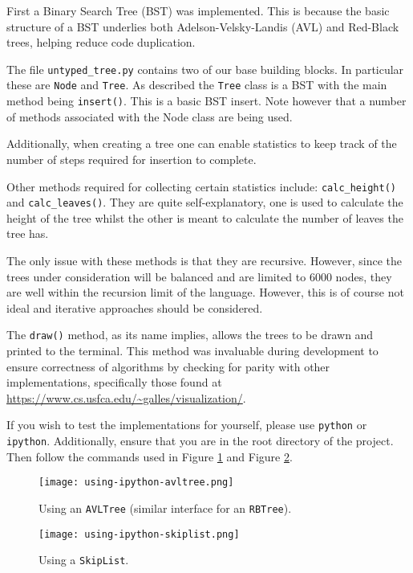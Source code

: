 \documentclass[article]{uom-coursework}
\begin{document}
First a Binary Search Tree (BST) was implemented. This is
because the basic structure of a BST underlies both
Adelson-Velsky-Landis (AVL) and Red-Black trees, helping reduce
code duplication.

The file \texttt{untyped\_tree.py} contains two of our base
building blocks. In particular these are \texttt{Node} and
\texttt{Tree}. As described the \texttt{Tree} class is a BST
with the main method being \texttt{insert()}. This is a basic
BST insert. Note however that a number of methods associated
with the Node class are being used.

Additionally, when creating a tree one can enable statistics to
keep track of the number of steps required for insertion to
complete.

Other methods required for collecting certain statistics
include: \texttt{calc\_height()} and \texttt{calc\_leaves()}.
They are quite self-explanatory, one is used to calculate the
height of the tree whilst the other is meant to calculate the
number of leaves the tree has.

The only issue with these methods is that they are recursive.
However, since the trees under consideration will be balanced
and are limited to 6000 nodes, they are well within the
recursion limit of the language. However, this is of course not
ideal and iterative approaches should be considered.

The \texttt{draw()} method, as its name implies, allows the
trees to be drawn and printed to the terminal. This method was
invaluable during development to ensure correctness of
algorithms by checking for parity with other implementations,
specifically those found at
\url{https://www.cs.usfca.edu/~galles/visualization/}.

If you wish to test the implementations for yourself, please use
\texttt{python} or \texttt{ipython}. Additionally, ensure that
you are in the root directory of the project. Then follow the
commands used in Figure \ref{fig:ipythonavl} and Figure
\ref{fig:ipythonskip}.

\begin{figure}[H]
\centering
\texttt{[image: using-ipython-avltree.png]}
\caption{Using an \texttt{AVLTree} (similar
interface for an \texttt{RBTree}).}
\label{fig:ipythonavl}
\end{figure}

\begin{figure}[H]
\centering
\texttt{[image: using-ipython-skiplist.png]}
\caption{Using a \texttt{SkipList}.}
\label{fig:ipythonskip}
\end{figure}
\end{document}
